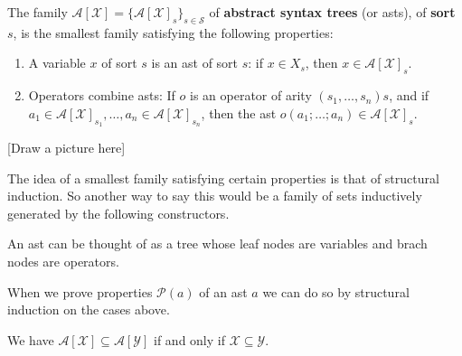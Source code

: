 \begin{defin}
    The family $\mathcal{A}[\mathcal{X}]=\{ \mathcal{A}[\mathcal{X}]_s \}_{s \in \mathcal{S}}$ of \textbf{abstract syntax trees} (or asts), of \textbf{sort} $s$, is the smallest family satisfying the following properties:
    
    \begin{enumerate}
        \item A variable $x$ of sort $s$ is an ast of sort $s$: if $x \in X_s$, then $x \in \mathcal{A}[\mathcal{X}]_s$.
        
        \item Operators combine asts: If $o$ is an operator of arity $(s_1, \dots, s_n)s$, and if $a_1 \in \mathcal{A}[\mathcal{X}]_{s_1}, \dots, a_n \in \mathcal{A}[\mathcal{X}]_{s_n}$, then the ast $o(a_1;\dots; a_n) \in \mathcal{A}[\mathcal{X}]_s$.
    \end{enumerate}
\end{defin}

[Draw a picture here]

\begin{remark}
    The idea of a smallest family satisfying certain properties is that of structural induction. So another way to say this would be a family of sets inductively generated by the following constructors.
\end{remark}

\begin{remark}
    An ast can be thought of as a tree whose leaf nodes are variables and brach nodes are operators. 
\end{remark}

\begin{remark}
    When we prove properties $\mathcal{P}(a)$ of an ast $a$ we can do so by structural induction on the cases above.
\end{remark}

\begin{lemma}
    We have $\mathcal{A}[\mathcal{X}] \subseteq \mathcal{A}[\mathcal{Y}]$ if and only if $\mathcal{X} \subseteq \mathcal{Y}$.
\end{lemma}


